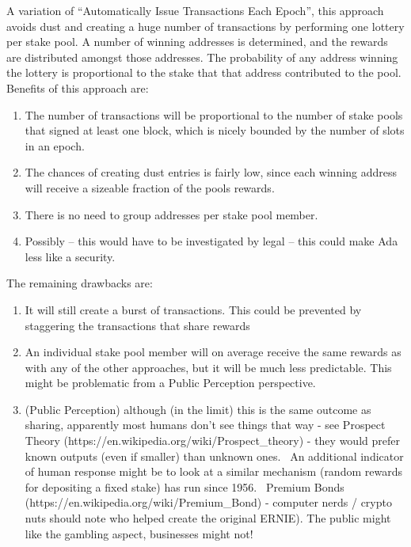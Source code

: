 \documentclass[11pt,a4paper]{article}
\begin{document}
A variation of ``Automatically Issue Transactions Each Epoch'', this
approach avoids dust and creating a huge number of transactions by
performing one lottery per stake pool. A number of winning addresses is
determined, and the rewards are distributed amongst those addresses. The
probability of any address winning the lottery is proportional to the
stake that that address contributed to the pool. Benefits of this
approach are:

\begin{enumerate}
\def\labelenumi{\arabic{enumi}.}
\item
  The number of transactions will be proportional to the number of stake
  pools that signed at least one block, which is nicely bounded by the
  number of slots in an epoch.
\item
  The chances of creating dust entries is fairly low, since each winning
  address will receive a sizeable fraction of the pools rewards.
\item
  There is no need to group addresses per stake pool member.
\item
  Possibly -- this would have to be investigated by legal -- this could
  make Ada less like a security.
\end{enumerate}

The remaining drawbacks are:

\begin{enumerate}
\def\labelenumi{\arabic{enumi}.}
\item
  It will still create a burst of transactions. This could be prevented
  by staggering the transactions that share rewards
\item
  An individual stake pool member will on average receive the same
  rewards as with any of the other approaches, but it will be much less
  predictable. This might be problematic from a Public Perception
  perspective.
\item
  (Public Perception) although (in the limit) this is the same outcome
  as sharing, apparently most humans don't see things that way - see
  Prospect Theory (https://en.wikipedia.org/wiki/Prospect\_theory) -
  they would prefer known outputs (even if smaller) than unknown ones.
  ~An additional indicator of human response might be to look at a
  similar mechanism (random rewards for depositing a fixed stake) has
  run since 1956. ~Premium Bonds
  (https://en.wikipedia.org/wiki/Premium\_Bond) - computer nerds /
  crypto nuts should note who helped create the original ERNIE). The
  public might like the gambling aspect, businesses might not!
\end{enumerate}
\end{document}
